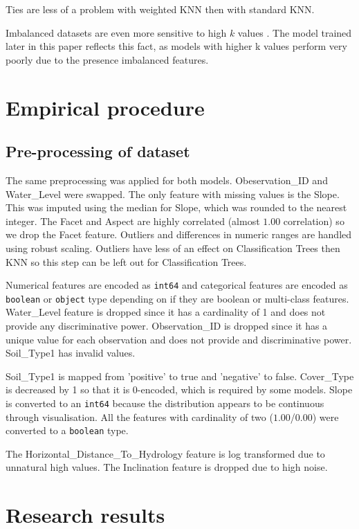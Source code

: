 \documentclass[conference]{IEEEtran}
\begin{document}
Ties are less of a problem with weighted KNN then with standard KNN.

Imbalanced datasets are even more sensitive to high $k$ values \cite[p.~193]{fundamentals}. The model trained later in this paper reflects this fact, as models with higher k values perform very poorly due to the presence imbalanced features.

\section{Empirical procedure}

\subsection{Pre-processing of dataset}

 The same preprocessing was applied for both models. Obeservation\_ID and Water\_Level were swapped. The only feature with missing values is the Slope. This was imputed using the median for Slope, which was rounded to the nearest integer. The Facet and Aspect are highly correlated (almost $1.00$ correlation) so we drop the Facet feature. Outliers and differences in numeric ranges are handled using robust scaling. Outliers have less of an effect on Classification Trees then KNN so this step can be left out for Classification Trees. 
 
 Numerical features are encoded as \texttt{int64} and categorical features are encoded as \texttt{boolean} or \texttt{object} type depending on if they are boolean or multi-class features. Water\_Level feature is dropped since it has a cardinality of 1 and does not provide any discriminative power. Observation\_ID is dropped since it has a unique value for each observation and does not provide and discriminative power. Soil\_Type1 has invalid values. 
 
 Soil\_Type1 is mapped from 'positive' to true and 'negative' to false. Cover\_Type is decreased by 1 so that it is 0-encoded, which is required by some models. Slope is converted to an \texttt{int64} because the distribution appears to be continuous through visualisation. All the features with cardinality of two ($1.00$/$0.00$) were converted to a \texttt{boolean} type.
 
 The Horizontal\_Distance\_To\_Hydrology feature is log transformed due to unnatural high values. The Inclination feature is dropped due to high noise.
 
 

\section{Research results}
\end{document}
